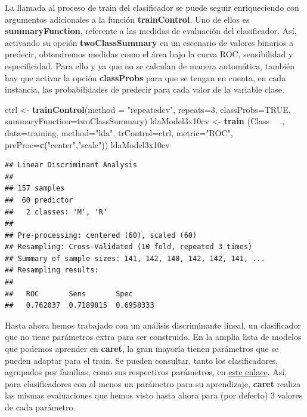 \documentclass[
]{article}
\newenvironment{Shaded}{\begin{snugshade}}{\end{snugshade}}
\newcommand{\DataTypeTok}[1]{\textcolor[rgb]{0.13,0.29,0.53}{#1}}
\newcommand{\DecValTok}[1]{\textcolor[rgb]{0.00,0.00,0.81}{#1}}
\newcommand{\KeywordTok}[1]{\textcolor[rgb]{0.13,0.29,0.53}{\textbf{#1}}}
\newcommand{\NormalTok}[1]{#1}
\newcommand{\OperatorTok}[1]{\textcolor[rgb]{0.81,0.36,0.00}{\textbf{#1}}}
\newcommand{\OtherTok}[1]{\textcolor[rgb]{0.56,0.35,0.01}{#1}}
\newcommand{\StringTok}[1]{\textcolor[rgb]{0.31,0.60,0.02}{#1}}
\begin{document}
La llamada al proceso de train del clasificador se puede seguir
enriqueciendo con argumentos adicionales a la función
\textbf{trainControl}. Uno de ellos es \textbf{summaryFunction},
referente a las medidas de evaluación del clasificador. Así, activando
su opción \textbf{twoClassSummary} en un escenario de valores binarios a
predecir, obtendremos medidas como el área bajo la curva ROC,
sensibilidad y especificidad. Para ello y ya que no se calculan de
manera automática, también hay que activar la opción \textbf{classProbs}
para que se tengan en cuenta, en cada instancia, las probabilidades de
predecir para cada valor de la variable clase.

\begin{Shaded}
\begin{Highlighting}[]
\NormalTok{ctrl <-}\StringTok{ }\KeywordTok{trainControl}\NormalTok{(}\DataTypeTok{method =} \StringTok{"repeatedcv"}\NormalTok{, }\DataTypeTok{repeats=}\DecValTok{3}\NormalTok{, }\DataTypeTok{classProbs=}\OtherTok{TRUE}\NormalTok{, }
                     \DataTypeTok{summaryFunction=}\NormalTok{twoClassSummary)}
\NormalTok{ldaModel3x10cv <-}\StringTok{ }\KeywordTok{train}\NormalTok{ (Class }\OperatorTok{~}\StringTok{ }\NormalTok{., }\DataTypeTok{data=}\NormalTok{training, }\DataTypeTok{method=}\StringTok{"lda"}\NormalTok{, }\DataTypeTok{trControl=}\NormalTok{ctrl, }
                         \DataTypeTok{metric=}\StringTok{"ROC"}\NormalTok{, }
                         \DataTypeTok{preProc=}\KeywordTok{c}\NormalTok{(}\StringTok{"center"}\NormalTok{,}\StringTok{"scale"}\NormalTok{))}
\NormalTok{ldaModel3x10cv}
\end{Highlighting}
\end{Shaded}

\begin{verbatim}
## Linear Discriminant Analysis 
## 
## 157 samples
##  60 predictor
##   2 classes: 'M', 'R' 
## 
## Pre-processing: centered (60), scaled (60) 
## Resampling: Cross-Validated (10 fold, repeated 3 times) 
## Summary of sample sizes: 141, 142, 140, 142, 142, 141, ... 
## Resampling results:
## 
##   ROC       Sens       Spec     
##   0.762037  0.7189815  0.6958333
\end{verbatim}

Hasta ahora hemos trabajado con un análisis discriminante lineal, un
clasificador que no tiene parámetros extra para ser construido. En la
amplia lista de modelos que podemos aprender en \textbf{caret}, la gran
mayoría tienen parámetros que se pueden adaptar para el train. Se pueden
consultar, tanto los clasificadores, agrupados por familias, como sus
respectivos parámetros, en
\href{https://topepo.github.io/caret/train-models-by-tag.html}{este
enlace}. Así, para clasificadores con al menos un parámetro para su
aprendizaje, \textbf{caret} realiza las mismas evaluaciones que hemos
visto hasta ahora para (por defecto) 3 valores de cada parámetro.
\end{document}
